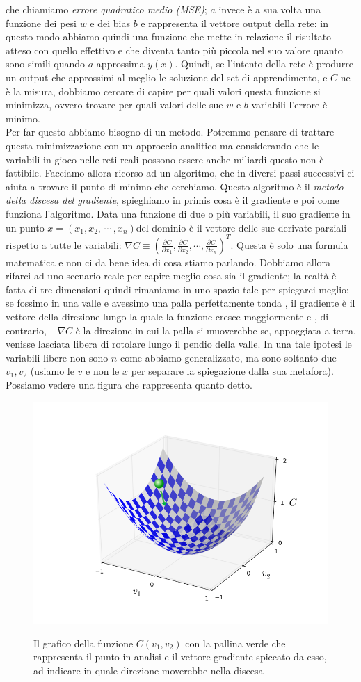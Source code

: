 che chiamiamo \textit{errore quadratico medio (MSE)}; $a$ invece è a sua volta una funzione dei pesi $w$ e dei bias $b$ e rappresenta il vettore output della rete: in questo modo abbiamo quindi una funzione che mette in relazione il risultato atteso con quello effettivo e che diventa tanto più piccola nel suo valore quanto sono simili quando $a$ approssima $y(x)$. Quindi, se l'intento della rete è produrre un output che approssimi al meglio le soluzione del set di apprendimento, e $C$ ne è la misura, dobbiamo cercare di capire per quali valori questa funzione si minimizza, ovvero trovare per quali valori delle sue $w$ e $b$ variabili l'errore è minimo. 
\\
Per far questo abbiamo bisogno di un metodo. Potremmo pensare di trattare questa minimizzazione con un approccio analitico ma considerando che le variabili in gioco nelle reti reali possono essere anche miliardi questo non è fattibile. 
Facciamo allora ricorso ad un algoritmo, che in diversi passi successivi ci aiuta a trovare il punto di minimo che cerchiamo. Questo algoritmo è il \textit{metodo della discesa del gradiente}, spieghiamo in primis cosa è il gradiente e poi come funziona l'algoritmo.
Data una funzione di due o più variabili, il suo gradiente in un punto $x=(x_{1}, x_{2},\, \cdots \, , x_{n})$del dominio è il vettore delle sue derivate parziali rispetto a tutte le variabili: $\nabla C \equiv (\frac{\partial C}{\partial x_{1}}, \frac{\partial C}{\partial x_{2}}, \cdots, \frac{\partial C}{\partial x_{n}})^{T}$. Questa è solo una formula matematica e non ci da bene idea di cosa stiamo parlando. Dobbiamo allora rifarci ad uno scenario reale per capire meglio cosa sia il gradiente; la realtà è fatta di tre dimensioni quindi rimaniamo in uno spazio tale per spiegarci meglio: se fossimo in una valle e avessimo una palla perfettamente tonda , il gradiente è il vettore della direzione lungo la quale la funzione cresce maggiormente e , di contrario, $-\nabla C$ è la direzione in cui la palla si muoverebbe se, appoggiata a terra, venisse lasciata libera di rotolare lungo il pendio della valle. In una tale ipotesi le variabili libere non sono $n$ come abbiamo generalizzato, ma sono soltanto due $v_{1}, v_{2}$ (usiamo le $v$ e non le $x$ per separare la spiegazione dalla sua metafora). Possiamo vedere una figura che rappresenta quanto detto.

\begin{figure}[hbtb]
\centering
{\includegraphics[width=.45\textwidth]{media_tesi/valley_with_ball.png}}
\caption{Il grafico della funzione $C(v_{1}, v_{2})$ con la pallina verde che rappresenta il punto in analisi e il vettore gradiente spiccato da esso, ad indicare in quale direzione moverebbe nella discesa}
\label{fig:subfig}
\end{figure}

